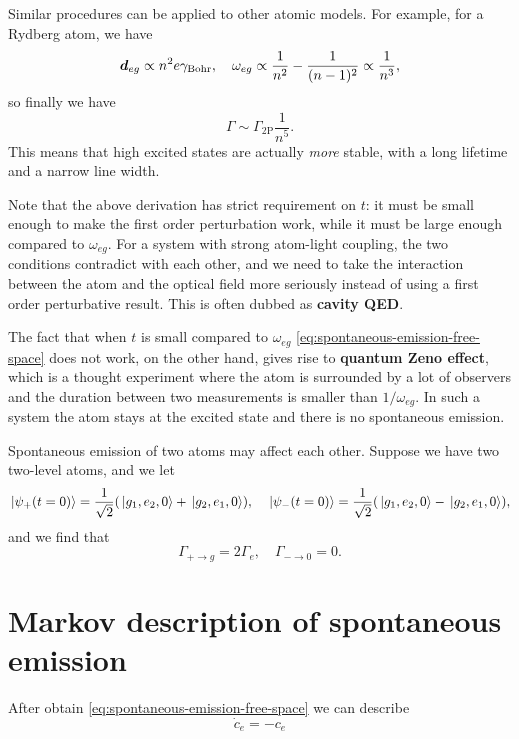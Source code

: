 \documentclass[hyperref, a4paper]{article}
\newcommand*{\concept}[1]{{\textbf{#1}}}
\begin{document}
Similar procedures can be applied to other atomic models. For example, for a Rydberg atom, we have 
\begin{equation}
    \vb*{d}_{eg} \propto n^2 e \gamma_\text{Bohr}, 
    \quad \omega_{eg} \propto \frac{1}{n^2} - \frac{1}{(n-1)^2} \propto \frac{1}{n^3},
\end{equation}
so finally we have 
\begin{equation}
    \Gamma \sim \Gamma_{2 \text{P}} \frac{1}{n^5}.
\end{equation}
This means that high excited states are actually \emph{more} stable, with a long lifetime and a narrow line width.

Note that the above derivation has strict requirement on $t$: it must be small enough to make the first order perturbation work,
while it must be large enough compared to $\omega_{eg}$.
For a system with strong atom-light coupling, the two conditions contradict with each other, and we need to take the interaction 
between the atom and the optical field more seriously instead of using a first order perturbative result.
This is often dubbed as \concept{cavity QED}.

The fact that when $t$ is small compared to $\omega_{eg}$ \eqref{eq:spontaneous-emission-free-space} does not work, on the other hand,  
gives rise to \concept{quantum Zeno effect}, which is a thought experiment where the atom is surrounded by a lot of observers
and the duration between two measurements is smaller than $1 / \omega_{eg}$. In such a system the atom stays at the excited state
and there is no spontaneous emission.

Spontaneous emission of two atoms may affect each other. Suppose we have two two-level atoms, and we let 
\begin{equation}
    \ket*{\psi_+(t=0)} = \frac{1}{\sqrt{2}} (\ket*{g_1, e_2, 0} + \ket*{g_2, e_1, 0}), \quad 
    \ket*{\psi_-(t=0)} = \frac{1}{\sqrt{2}} (\ket*{g_1, e_2, 0} - \ket*{g_2, e_1, 0}),
\end{equation}
and we find that 
\begin{equation}
    \Gamma_{+ \to g} = 2 \Gamma_e, \quad \Gamma_{- \to 0} = 0.
\end{equation}

\section{Markov description of spontaneous emission}

After obtain \eqref{eq:spontaneous-emission-free-space} we can describe 
\begin{equation}
    \dot{c}_e = - c_e 
\end{equation}
\end{document}
